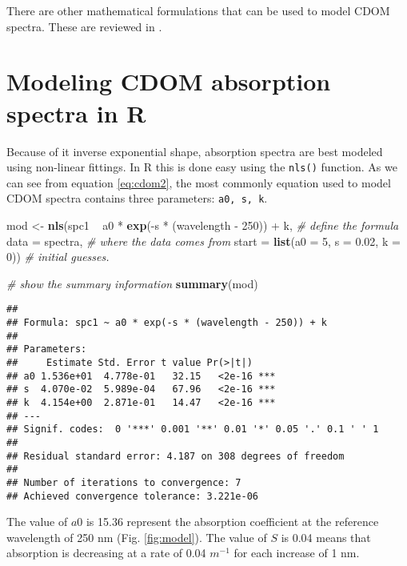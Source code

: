 \documentclass[]{book}
\newenvironment{Shaded}{\begin{snugshade}}{\end{snugshade}}
\newcommand{\KeywordTok}[1]{\textcolor[rgb]{0.13,0.29,0.53}{\textbf{{#1}}}}
\newcommand{\DataTypeTok}[1]{\textcolor[rgb]{0.13,0.29,0.53}{{#1}}}
\newcommand{\DecValTok}[1]{\textcolor[rgb]{0.00,0.00,0.81}{{#1}}}
\newcommand{\FloatTok}[1]{\textcolor[rgb]{0.00,0.00,0.81}{{#1}}}
\newcommand{\StringTok}[1]{\textcolor[rgb]{0.31,0.60,0.02}{{#1}}}
\newcommand{\CommentTok}[1]{\textcolor[rgb]{0.56,0.35,0.01}{\textit{{#1}}}}
\newcommand{\NormalTok}[1]{{#1}}
\begin{document}
There are other mathematical formulations that can be used to model CDOM
spectra. These are reviewed in \citet{Twardowski2004}.

\section{Modeling CDOM absorption spectra in R}\label{sl}

Because of it inverse exponential shape, absorption spectra are best
modeled using non-linear fittings. In R this is done easy using the
\texttt{nls()} function. As we can see from equation \ref{eq:cdom2}, the
most commonly equation used to model CDOM spectra contains three
parameters: \texttt{a0,\ s,\ k}.

\begin{Shaded}
\begin{Highlighting}[]
\NormalTok{mod <-}\StringTok{ }\KeywordTok{nls}\NormalTok{(spc1 ~}\StringTok{ }\NormalTok{a0 *}\StringTok{ }\KeywordTok{exp}\NormalTok{(-s *}\StringTok{ }\NormalTok{(wavelength -}\StringTok{ }\DecValTok{250}\NormalTok{)) +}\StringTok{ }\NormalTok{k, }\CommentTok{# define the formula}
           \DataTypeTok{data =} \NormalTok{spectra, }\CommentTok{# where the data comes from}
           \DataTypeTok{start =} \KeywordTok{list}\NormalTok{(}\DataTypeTok{a0 =} \DecValTok{5}\NormalTok{, }\DataTypeTok{s =} \FloatTok{0.02}\NormalTok{, }\DataTypeTok{k =} \DecValTok{0}\NormalTok{)) }\CommentTok{# initial guesses.}

\CommentTok{# show the summary information}
\KeywordTok{summary}\NormalTok{(mod)}
\end{Highlighting}
\end{Shaded}

\begin{verbatim}
## 
## Formula: spc1 ~ a0 * exp(-s * (wavelength - 250)) + k
## 
## Parameters:
##     Estimate Std. Error t value Pr(>|t|)    
## a0 1.536e+01  4.778e-01   32.15   <2e-16 ***
## s  4.070e-02  5.989e-04   67.96   <2e-16 ***
## k  4.154e+00  2.871e-01   14.47   <2e-16 ***
## ---
## Signif. codes:  0 '***' 0.001 '**' 0.01 '*' 0.05 '.' 0.1 ' ' 1
## 
## Residual standard error: 4.187 on 308 degrees of freedom
## 
## Number of iterations to convergence: 7 
## Achieved convergence tolerance: 3.221e-06
\end{verbatim}

The value of \(a0\) is 15.36 represent the absorption coefficient at the
reference wavelength of 250 nm (Fig. \ref{fig:model}). The value of
\(S\) is 0.04 means that absorption is decreasing at a rate of 0.04
\(m^{-1}\) for each increase of 1 nm.
\end{document}
